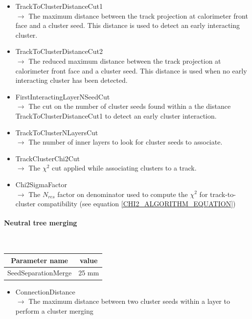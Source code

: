 \documentclass[cits]{JINST}
\begin{document}
\begin{itemize}
  \item TrackToClusterDistanceCut1 \\
  $\rightarrow$ The maximum distance between the track projection at calorimeter front face and a cluster seed. This distance is used to detect an early interacting cluster.
  \item TrackToClusterDistanceCut2 \\
  $\rightarrow$ The reduced maximum distance between the track projection at calorimeter front face and a cluster seed. This distance is used when no early interacting cluster has been detected.
  \item FirstInteractingLayerNSeedCut \\
  $\rightarrow$ The cut on the number of cluster seeds found within a the distance TrackToClusterDistanceCut1 to detect an early cluster interaction.
  \item TrackToClusterNLayersCut \\
  $\rightarrow$ The number of inner layers to look for cluster seeds to associate.
  \item TrackClusterChi2Cut \\
  $\rightarrow$ The $\chi^2$ cut applied while associating clusters to a track.
  \item Chi2SigmaFactor \\
  $\rightarrow$ The $N_{res}$ factor on denominator used to compute the $\chi^2$ for track-to-cluster compatibility (see equation \ref{CHI2_ALGORITHM_EQUATION})
\end{itemize}


\paragraph{Neutral tree merging} ~

\begin{table}[!ht]
  \begin{center}
    \begin{tabu} to \linewidth { c | c } 
          Parameter name & value \\
          \hline
          SeedSeparationMerge & 25 mm
    \end{tabu}
  \end{center}
\end{table}

\begin{itemize}
  \item ConnectionDistance \\
  $\rightarrow$ The maximum distance between two cluster seeds within a layer to perform a cluster merging
\end{itemize}
\end{document}
